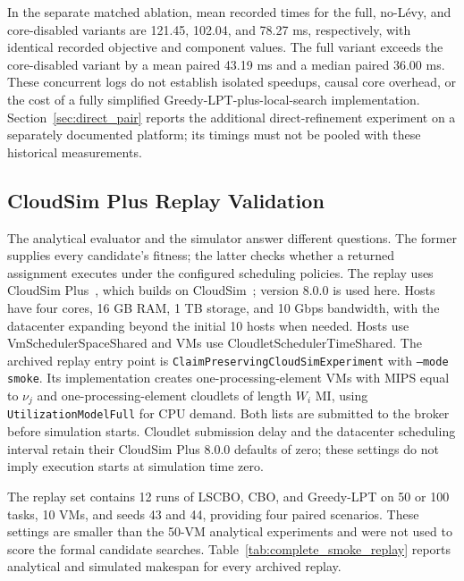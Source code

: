 \documentclass[pdflatex,onecolumn,sn-mathphys-num]{sn-jnl}
\begin{document}
In the separate matched ablation, mean recorded times for the full, no-L\'{e}vy, and core-disabled variants are 121.45, 102.04, and 78.27 ms, respectively, with identical recorded objective and component values. The full variant exceeds the core-disabled variant by a mean paired 43.19 ms and a median paired 36.00 ms. These concurrent logs do not establish isolated speedups, causal core overhead, or the cost of a fully simplified Greedy-LPT-plus-local-search implementation. Section~\ref{sec:direct_pair} reports the additional direct-refinement experiment on a separately documented platform; its timings must not be pooled with these historical measurements.

\FloatBarrier

\subsection{CloudSim Plus Replay Validation}\label{sec:replay_validation}
The analytical evaluator and the simulator answer different questions. The former supplies every candidate's fitness; the latter checks whether a returned assignment executes under the configured scheduling policies. The replay uses CloudSim Plus~\cite{SilvaFilho2017}, which builds on CloudSim~\cite{Calheiros2011}; version 8.0.0 is used here. Hosts have four cores, 16 GB RAM, 1 TB storage, and 10 Gbps bandwidth, with the datacenter expanding beyond the initial 10 hosts when needed. Hosts use VmSchedulerSpaceShared and VMs use CloudletSchedulerTimeShared. The archived replay entry point is \texttt{ClaimPreservingCloudSimExperiment} with \texttt{--mode smoke}. Its implementation creates one-processing-element VMs with MIPS equal to $\nu_j$ and one-processing-element cloudlets of length $W_i$ MI, using \texttt{UtilizationModelFull} for CPU demand. Both lists are submitted to the broker before simulation starts. Cloudlet submission delay and the datacenter scheduling interval retain their CloudSim Plus 8.0.0 defaults of zero; these settings do not imply execution starts at simulation time zero.

The replay set contains 12 runs of LSCBO, CBO, and Greedy-LPT on 50 or 100 tasks, 10 VMs, and seeds 43 and 44, providing four paired scenarios. These settings are smaller than the 50-VM analytical experiments and were not used to score the formal candidate searches. Table~\ref{tab:complete_smoke_replay} reports analytical and simulated makespan for every archived replay.
\end{document}
